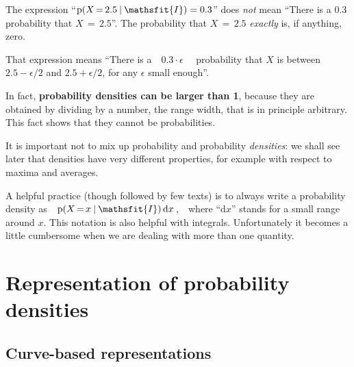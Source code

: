 \documentclass[
  a4paper,
  DIV=11,
  numbers=noendperiod,
  oneside]{scrreprt}
\begin{document}
\begin{tcolorbox}[enhanced jigsaw, leftrule=.75mm, colbacktitle=quarto-callout-warning-color!10!white, arc=.35mm, opacitybacktitle=0.6, bottomtitle=1mm, bottomrule=.15mm, colback=white, toprule=.15mm, opacityback=0, colframe=quarto-callout-warning-color-frame, toptitle=1mm, titlerule=0mm, breakable, title={\faIcon{exclamation-circle} Probability densities are not probabilities}, rightrule=.15mm, left=2mm, coltitle=black]

The expression
{``\(\mathrm{p}(X\mathord{\,=\,}2.5 \nonscript\:\vert\nonscript\:\mathopen{} \mathsfit{I})=0.3\)''}
does \emph{not} mean ``There is a \(0.3\) probability that
\(X\mathord{\,=\,}2.5\)''. The probability that \(X\mathord{\,=\,}2.5\)
\emph{exactly} is, if anything, zero.

That expression means ``There is a~~\(0.3\cdot \epsilon\)~~ probability
that \(X\) is between \(2.5-\epsilon/2\) and \(2.5+\epsilon/2\), for any
\(\epsilon\) small enough''.

In fact, \textbf{probability densities can be larger than 1}, because
they are obtained by dividing by a number, the range width, that is in
principle arbitrary. This fact shows that they cannot be probabilities.

It is important not to mix up probability and probability
\emph{densities}: we shall see later that densities have very different
properties, for example with respect to maxima and averages.

\end{tcolorbox}

A helpful practice (though followed by few texts) is to always write a
probability density
as~~{\(\mathrm{p}(X\mathord{\,=\,}x \nonscript\:\vert\nonscript\:\mathopen{} \mathsfit{I})\,\mathrm{d}x\)\,,}~~where
{``\(\mathrm{d}x\)''} stands for a small range around \(x\). This
notation is also helpful with integrals. Unfortunately it becomes a
little cumbersome when we are dealing with more than one quantity.

\hypertarget{representation-of-probability-densities}{%
\section{Representation of probability
densities}\label{representation-of-probability-densities}}

\hypertarget{curve-based-representations-1}{%
\subsection{Curve-based
representations}\label{curve-based-representations-1}}
\end{document}

